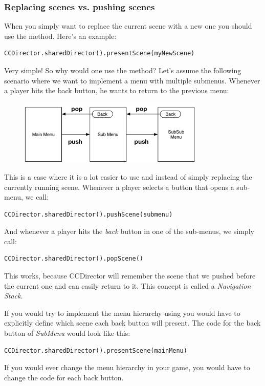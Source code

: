 \subsubsection{Replacing scenes vs. pushing scenes}
When you simply want to replace the current scene with a new one you should use
the  method. Here's an example:
\begin{lstlisting}
CCDirector.sharedDirector().presentScene(myNewScene)
\end{lstlisting}
Very simple! So why would one use the  method?
Let's assume the following scenario where we want to implement a menu with
multiple submenus. Whenever a player hits the back button, he wants to return
to the previous menu:
\begin{figure}[H]
		\centering
		\includegraphics[width=250pt]{images/firstproject/navigation_stack.png}
\end{figure}
This is a case where it is a lot easier to use  and
 instead of simply replacing the currently running scene.
Whenever a player selects a button that opens a sub-menu, we call:
\begin{lstlisting}
CCDirector.sharedDirector().pushScene(submenu)
\end{lstlisting}
And whenever a player hits the \textit{back} button in one of the sub-menus, we
simply call:
\begin{lstlisting}
CCDirector.sharedDirector().popScene()
\end{lstlisting}
This works, because CCDirector will remember the scene that we pushed before the
current one and can easily return to it. This concept is called a
\textit{Navigation Stack}.

If you would try to implement the menu hierarchy using
 you would have to explicitly define which scene each
back button will present. The code for the back button of \textit{SubMenu}
would look like this:
\begin{lstlisting}
CCDirector.sharedDirector().presentScene(mainMenu)
\end{lstlisting}
If you would ever change the menu hierarchy in your game, you would have to
change the code for each back button.

